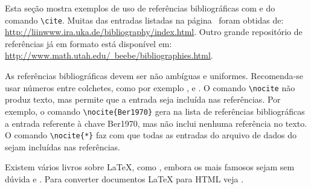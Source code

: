 Esta seção mostra exemplos de uso de referências bibliográficas com \BibTeX{} e
do comando \verb|\cite|.  Muitas das entradas listadas na
página~\pageref{ref-bib} foram obtidas de:
\href{http://liinwww.ira.uka.de/bibliography/index.html}{http://liinwww.ira.uka.de/bibliography/index.html}.
Outro grande repositório de referências já em formato \BibTeX{} está disponível
em:
\href{http://www.math.utah.edu/~beebe/bibliographies.html}{http://www.math.utah.edu/~beebe/bibliographies.html}.

As referências bibliográficas devem ser não ambíguas e uniformes. Recomenda-se
usar números entre colchetes, como por exemplo \cite{SmiJon1999},
\cite{Knu1989} e \cite{LeeSwi2002}. O comando \verb|\nocite| não produz texto,
mas permite que a entrada seja incluída nas referências. Por exemplo, o comando
\verb|\nocite{Ber1970}| gera na lista de referências bibliográficas a entrada
referente à chave \textsf{Ber1970}, mas não inclui nenhuma referência no texto.
O comando \verb|\nocite{*}| faz com que todas as entradas do arquivo de dados
do \BibTeX{} sejam incluídas nas referências. \nocite{Ber1970}

Existem vários livros sobre \LaTeX{}, como \cite{Bue1990,Hah1991,KopDal1995},
embora os mais famosos sejam sem dúvida \cite{Lam1996} e \cite{GooMitSam1994}.
Para converter documentos \LaTeX{} para HTML veja \cite[pg.1--10]{Dra1994}.
